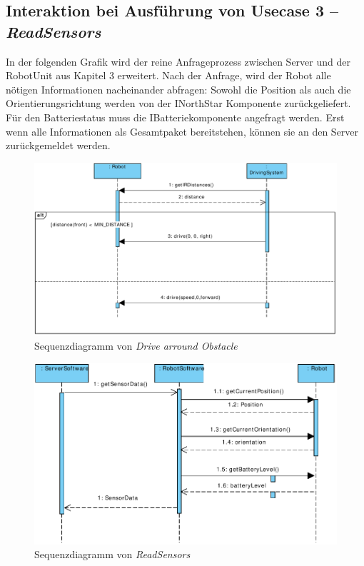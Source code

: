 	\subsection*{Interaktion bei Ausführung von Usecase 3 – \emph{ReadSensors}}
In der folgenden Grafik wird der reine Anfrageprozess zwischen Server und der RobotUnit aus Kapitel 3 erweitert. Nach der Anfrage, wird der Robot alle nötigen Informationen nacheinander abfragen: Sowohl die Position als auch die Orientierungsrichtung werden von der INorthStar Komponente zurückgeliefert. Für den Batteriestatus muss die IBatteriekomponente angefragt werden. Erst wenn alle Informationen als Gesamtpaket bereitstehen, können sie an den Server zurückgemeldet werden.
\\
	\begin{figure}[H]
		\centering
		\includegraphics[width=1\textwidth]{img/1-Entwurf-8-DriveArroundObstacle}
		\caption{Sequenzdiagramm von \emph{Drive arround Obstacle}}
		\label{Umfahren von statichen Objekten}
	\end{figure}
	
	\begin{figure}[H]
		\centering
		\includegraphics[width=1\textwidth]{img/0-Entwurf-8-ReadSens}
		\caption{Sequenzdiagramm von \emph{ReadSensors}}
		\label{ReadSensors}
	\end{figure}
	
